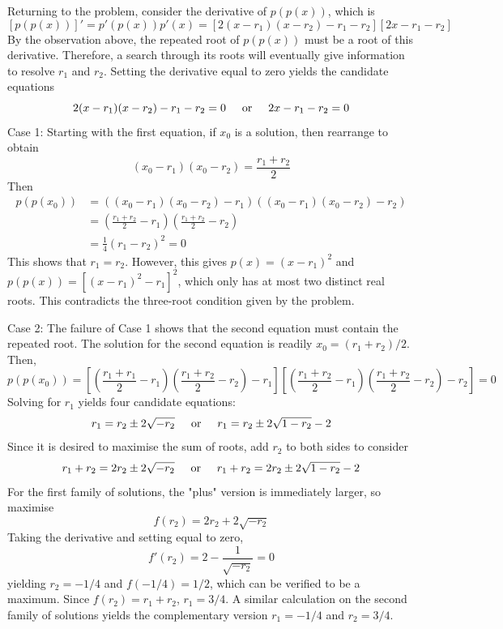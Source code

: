 \begin{enumerate}
 Returning to the problem, consider the derivative of $p(p(x))$, which is
 \[[p(p(x))]' = p'(p(x))p'(x) = \left[2(x-r_1)(x-r_2)-r_1-r_2\right] \left[2x-r_1-r_2\right]\]By the observation above, the repeated root of $p(p(x))$ must be a root of this derivative. Therefore, a search through its roots will eventually give information to resolve $r_1$ and $r_2$. Setting the derivative equal to zero yields the candidate equations
 \[2(x-r_1)(x-r_2)-r_1-r_2 = 0 \hspace{.5cm}\text{or}\hspace{.5cm} 2x-r_1-r_2 = 0\]Case 1: Starting with the first equation, if $x_0$ is a solution, then rearrange to obtain
 \[(x_0-r_1)(x_0-r_2) = \frac{r_1+r_2}{2}\]Then
 \begin{align*} p(p(x_0)) &= ((x_0-r_1)(x_0-r_2)-r_1)((x_0-r_1)(x_0-r_2)-r_2) \\ &= \left(\frac{r_1+r_2}{2} - r_1\right)\left(\frac{r_1+r_2}{2} - r_2\right) \\ &= \frac{1}{4}(r_1-r_2)^2 = 0 \end{align*}
This shows that $r_1=r_2$. However, this gives $p(x) = (x-r_1)^2$ and $p(p(x)) = \left[(x-r_1)^2-r_1\right]^2$, which only has at most two distinct real roots. This contradicts the three-root condition given by the problem.

 Case 2: The failure of Case 1 shows that the second equation must contain the repeated root. The solution for the second equation is readily $x_0 = (r_1+r_2)/2$. Then,
 \[p(p(x_0)) = \left[\left(\frac{r_1+r_1}{2}-r_1\right)\left(\frac{r_1+r_2}{2}-r_2\right)-r_1\right]\left[\left(\frac{r_1+r_2}{2}-r_1\right)\left(\frac{r_1+r_2}{2}-r_2\right)-r_2\right] = 0\]Solving for $r_1$ yields four candidate equations:
 \[r_1 = r_2\pm 2\sqrt{-r_2} \hspace{.5cm}\text{or}\hspace{.5cm} r_1 = r_2\pm 2\sqrt{1-r_2} - 2\]Since it is desired to maximise the sum of roots, add $r_2$ to both sides to consider
 \[r_1+r_2 = 2r_2\pm 2\sqrt{-r_2} \hspace{.5cm}\text{or}\hspace{.5cm} r_1+r_2 = 2r_2\pm 2\sqrt{1-r_2} - 2\]For the first family of solutions, the "plus" version is immediately larger, so maximise
 \[f(r_2) = 2r_2 + 2\sqrt{-r_2}\]Taking the derivative and setting equal to zero,
 \[f'(r_2) = 2 - \frac{1}{\sqrt{-r_2}} = 0\]yielding $r_2=-1/4$ and $f(-1/4)=1/2$, which can be verified to be a maximum. Since $f(r_2)=r_1+r_2$, $r_1=3/4$. A similar calculation on the second family of solutions yields the complementary version $r_1=-1/4$ and $r_2=3/4$.


\end{enumerate}
